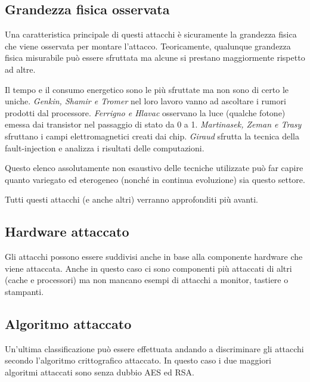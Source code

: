 		\subsection{Grandezza fisica osservata}
		
			Una caratteristica principale di questi attacchi è sicuramente la grandezza fisica che viene osservata per montare l'attacco. Teoricamente, qualunque grandezza fisica misurabile può essere sfruttata ma alcune si prestano maggiormente rispetto ad altre. 
			
			Il tempo e il consumo energetico sono le più sfruttate ma non sono di certo le uniche. \emph{Genkin, Shamir e Tromer} nel loro lavoro \cite{genkin2014rsa} vanno ad ascoltare i rumori prodotti dal processore. \emph{Ferrigno e Hlavac}\cite{ferrigno2008aes} osservano la luce (qualche fotone) emessa dai transistor nel passaggio di stato da 0 a 1. \emph{Martinasek, Zeman e Trasy} sfruttano i campi elettromagnetici creati dai chip. \emph{Giraud}\cite{giraud2004dfa} sfrutta la tecnica della fault-injection e analizza i risultati delle computazioni.
			
			Questo elenco assolutamente non esaustivo delle tecniche utilizzate può far capire quanto variegato ed eterogeneo (nonché in continua evoluzione) sia questo settore.
			
			Tutti questi attacchi (e anche altri) verranno approfonditi più avanti.
			
		\subsection{Hardware attaccato}
		
			Gli attacchi possono essere suddivisi anche in base alla componente hardware che viene attaccata. Anche in questo caso ci sono componenti più attaccati di altri (cache e processori) ma non mancano esempi di attacchi a monitor\cite{van1985electromagnetic}, tastiere\cite{asonov2004keyboard} o stampanti\cite{backes2010acoustic}.
			
		\subsection{Algoritmo attaccato}
		
			Un'ultima classificazione può essere effettuata andando a discriminare gli attacchi secondo l'algoritmo crittografico attaccato. In questo caso i due maggiori algoritmi attaccati sono senza dubbio AES ed RSA.
			
